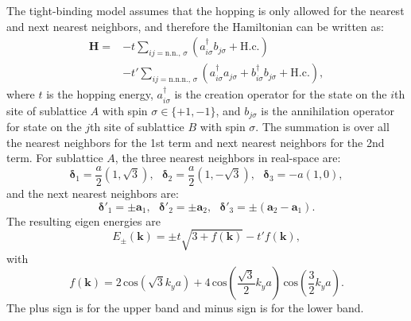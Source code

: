 \documentclass[pdflatex, sectionletters, 12pt, final, phd]{pittetd}    %
\begin{document}
The tight-binding model assumes that the hopping is only allowed for the nearest and next nearest neighbors, and therefore the Hamiltonian can be written as\cite{wallace1947band, neto2009electronic}:
\begin{equation}
\begin{split}
\mathbf{H} = & - t \sum_{ij=\mathrm{n.n.}, \, \sigma} (a_{i\sigma}^{\dagger} b_{j\sigma} + \mathrm{H. c.}) \\
& - t' \sum_{ij=\mathrm{n.n.n.}, \, \sigma} (a_{i\sigma}^{\dagger} a_{j\sigma} + b_{i\sigma}^{\dagger} b_{j\sigma} + \mathrm{H. c.}),
\end{split}
\label{EQN:Hamiltonian}
\end{equation}
where $t$ is the hopping energy, $a_{i\sigma}^{\dagger}$ is the creation operator for the state on the $i$th site of sublattice $A$ with spin $\sigma\in\{+1, -1\}$, and $b_{j\sigma}$ is the annihilation operator for state on the $j$th site of sublattice $B$ with spin $\sigma$. The summation is over all the nearest neighbors for the 1st term and next nearest neighbors for the 2nd term. For sublattice $A$, the three nearest neighbors in real-space are: 
$$\mathbf{\delta}_1 = \frac{a}{2}\left(1, \sqrt{3}\right), \ \ \ \mathbf{\delta}_2 =  \frac{a}{2}\left(1, -\sqrt{3}\right), \ \ \ \mathbf{\delta}_3 = -a(1, 0),$$
and the next nearest neighbors are:
$$\mathbf{\delta}'_1 = \pm \mathbf{a}_1, \ \ \ \mathbf{\delta}'_2 =  \pm \mathbf{a}_2, \ \ \ \mathbf{\delta}'_3 = \pm (\mathbf{a}_2 - \mathbf{a}_1).$$
The resulting eigen energies are\cite{wallace1947band, neto2009electronic}
$$E_{\pm}(\mathbf{k}) = \pm t \sqrt{3 + f(\mathbf{k})} - t'f(\mathbf{k}),$$
with
$$f(\mathbf{k}) = 2 \, \mathrm{cos}\left( \sqrt{3} k_y a \right) + 4 \, \mathrm{cos}\left(\frac{\sqrt{3}}{2} k_y a \right) \, \mathrm{cos}\left( \frac{3}{2} k_y a \right).$$
The plus sign is for the upper band and minus sign is for the lower band. 
\end{document}
